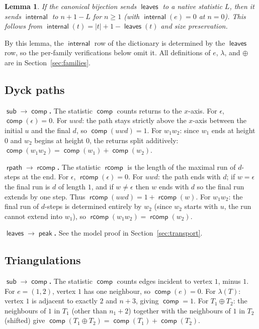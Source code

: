 \documentclass[a4paper,11pt]{article}
\newtheorem{lemma}[theorem]{Lemma}
\theoremstyle{definition}
\DeclareMathOperator{\comp}{\mathsf{comp}}
\DeclareMathOperator{\rcomp}{\mathsf{rcomp}}
\DeclareMathOperator{\rpath}{\mathsf{rpath}}
\DeclareMathOperator{\leaves}{\mathsf{leaves}}
\DeclareMathOperator{\internal}{\mathsf{internal}}
\DeclareMathOperator{\peak}{\mathsf{peak}}
\DeclareMathOperator{\subtrees}{\mathsf{sub}}
\begin{document}
\begin{lemma}\label{lem:transport-internal}
If the canonical bijection sends $\leaves$ to a native
statistic $L$, then it sends $\internal$ to $n + 1 - L$
for $n \geq 1$ (with $\internal(e) = 0$ at $n = 0$).
This follows from
$\internal(t) = |t| + 1 - \leaves(t)$ and size
preservation.
\end{lemma}

By this lemma, the $\internal$ row of the dictionary is
determined by the $\leaves$ row, so the per-family
verifications below omit it. All definitions of $e$,
$\lambda$, and $\oplus$ are in Section~\ref{sec:families}.

\subsection{Dyck paths}\label{sec:dict-dyck}

\textbf{$\boldsymbol{\subtrees \to \comp}$.}
The statistic $\comp$ counts returns to the $x$-axis.
For $\epsilon$, $\comp(\epsilon) = 0$. For $uwd$: the
path stays strictly above the $x$-axis between the
initial $u$ and the final $d$, so $\comp(uwd) = 1$.
For $w_1 w_2$: since $w_1$ ends at height $0$ and $w_2$
begins at height $0$, the returns split additively:
$\comp(w_1 w_2) = \comp(w_1) + \comp(w_2)$.

\textbf{$\boldsymbol{\rpath \to \rcomp}$.}
The statistic $\rcomp$ is the length of the maximal run
of $d$-steps at the end. For $\epsilon$,
$\rcomp(\epsilon) = 0$. For $uwd$: the path ends with
$d$; if $w = \epsilon$ the final run is $d$ of length
$1$, and if $w \neq \epsilon$ then $w$ ends with $d$ so
the final run extends by one step. Thus
$\rcomp(uwd) = 1 + \rcomp(w)$.
For $w_1 w_2$: the final run of $d$-steps is determined
entirely by $w_2$ (since $w_2$ starts with $u$, the run
cannot extend into $w_1$), so
$\rcomp(w_1 w_2) = \rcomp(w_2)$.

\textbf{$\boldsymbol{\leaves \to \peak}$.}
See the model proof in Section~\ref{sec:transport}.

\subsection{Triangulations}\label{sec:dict-tri}

\textbf{$\boldsymbol{\subtrees \to \comp}$.}
The statistic $\comp$ counts edges incident to vertex
$1$, minus $1$. For $e = (1,2)$, vertex $1$ has one
neighbour, so $\comp(e) = 0$. For $\lambda(T)$: vertex
$1$ is adjacent to exactly $2$ and $n{+}3$, giving
$\comp = 1$. For $T_1 \oplus T_2$: the neighbours of $1$
in $T_1$ (other than $n_1{+}2$) together with the
neighbours of $1$ in $T_2$ (shifted) give
$\comp(T_1 \oplus T_2)
= \comp(T_1) + \comp(T_2)$.
\end{document}
